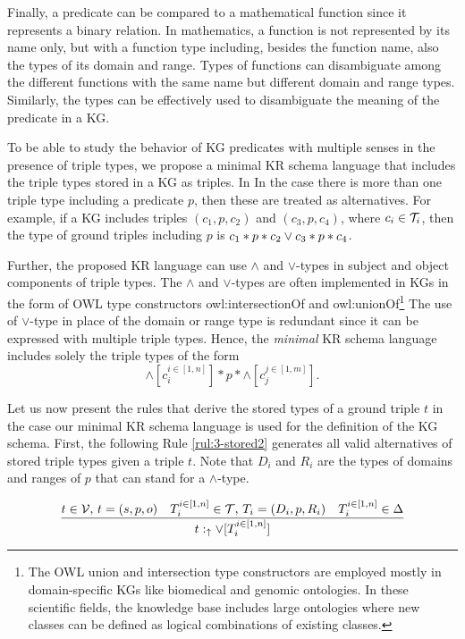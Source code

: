 \documentclass[runningheads]{llncs}
\newcommand{\uarr}{\uparrow}
\newcommand{\V}{{\cal V}}
\newcommand{\T}{{\cal T}}
\begin{document}
Finally, a predicate can be compared to a mathematical function since
it represents a binary relation. In mathematics, a function is not
represented by its name only, but with a function type including,
besides the function name, also the types of its domain and
range. Types of functions can disambiguate among the different
functions with the same name but different domain and range
types. Similarly, the types can be effectively used to disambiguate
the meaning of the predicate in a KG.

To be able to study the behavior of KG predicates with multiple senses
in the presence of triple types, we propose a minimal KR schema
language that includes the triple types stored in a KG as triples. In
In the case there is more than one triple type including a predicate
$p$, then these are treated as alternatives. For example, if a KG
includes triples $(c_1,p,c_2)$ and $(c_3,p,c_4)$, where $c_i\in\T_i$, then the type of ground triples including $p$ is
$c_1*p*c_2\lor\/c_3*p*c_4$.

Further, the proposed KR language can use $\land$ and $\lor$-types in
subject and object components of triple types. The $\land$ and
$\lor$-types are often implemented in KGs in the form of OWL type
constructors owl:intersectionOf and owl:unionOf\footnote{The OWL union
  and intersection type constructors are employed mostly in domain-specific KGs like biomedical and genomic ontologies. In these
  scientific fields, the knowledge base includes large ontologies where
  new classes can be defined as logical combinations of existing
  classes.} The use of $\lor$-type in place of the domain or range
type is redundant since it can be expressed with multiple triple
types. Hence, the \emph{minimal} KR schema language includes solely
the triple types of the form
$$\land[c_i^{i\in[1,n]}]*p*\land[c_j^{j\in[1,m]}].$$

Let us now present the rules that derive the stored types of a ground
triple $t$ in the case our minimal KR schema language is used for the
definition of the KG schema. First, the following Rule
\ref{rul:3-stored2} generates all valid alternatives of stored triple
types given a triple $t$. Note that $D_i$ and $R_i$ are the types of
domains and ranges of $p$ that can stand for a $\land$-type.

\begin{equation}
\label{rul:3-stored2}
\dfrac{t\in\V,\, t=(s,p,o)\quad T_i^{i\in[1,n]}\in\T,\, T_i=(D_i,p,R_i)\quad\/T_i^{i\in[1,n]}\in\Delta}
      {t:_\uarr\/\lor[T_i^{i\in[1,n]}]}
\end{equation}
\end{document}
